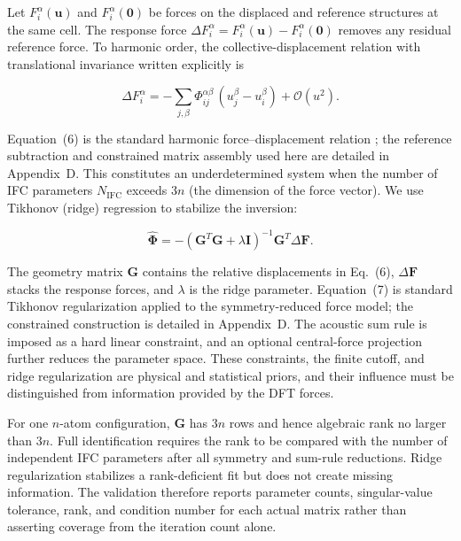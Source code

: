 \documentclass[aps,prb,reprint,amsmath,amssymb,floatfix]{revtex4-2}
\begin{document}
Let \(F_i^\alpha(\mathbf u)\) and \(F_i^\alpha(\mathbf0)\) be forces on the
displaced and reference structures at the same cell. The response force
\(\Delta F_i^\alpha=F_i^\alpha(\mathbf u)-F_i^\alpha(\mathbf0)\) removes any
residual reference force. To harmonic order, the collective-displacement
relation with translational invariance written explicitly is

\begin{equation}
\Delta F_i^\alpha = -\sum_{j,\beta}
\Phi_{ij}^{\alpha\beta}\,(u_j^\beta-u_i^\beta)
+\mathcal O(u^2).
\end{equation}

Equation~(6) is the standard harmonic force--displacement relation
\cite{ref13}; the reference subtraction and constrained matrix assembly used
here are detailed in Appendix~D.
This constitutes an underdetermined system when the number of IFC
parameters \(N_\text{IFC}\) exceeds \(3n\) (the dimension of the force
vector). We use Tikhonov (ridge) regression to stabilize the inversion:

\begin{equation}
\hat{\boldsymbol{\Phi}} = -\left(\mathbf{G}^T\mathbf{G} + \lambda\mathbf{I}\right)^{-1} \mathbf{G}^T \Delta\mathbf{F}.
\end{equation}

The geometry matrix \(\mathbf G\) contains the relative displacements in
Eq.~(6), \(\Delta\mathbf F\) stacks the response forces, and \(\lambda\) is the
ridge parameter. Equation~(7) is standard Tikhonov regularization applied to
the symmetry-reduced force model; the constrained construction is detailed in
Appendix~D. The acoustic sum rule is imposed as a hard linear constraint, and
an optional central-force projection further reduces the parameter space.
These constraints, the finite cutoff, and ridge regularization are physical and
statistical priors, and their influence must be distinguished from information
provided by the DFT forces.

For one \(n\)-atom configuration, \(\mathbf G\) has \(3n\) rows and hence
algebraic rank no larger than \(3n\). Full identification requires the rank to
be compared with the number of independent IFC parameters after all symmetry
and sum-rule reductions. Ridge regularization stabilizes a rank-deficient fit
but does not create missing information. The validation therefore reports parameter counts, singular-value tolerance, rank, and condition number
for each actual matrix rather than asserting coverage from the iteration count
alone.
\end{document}
